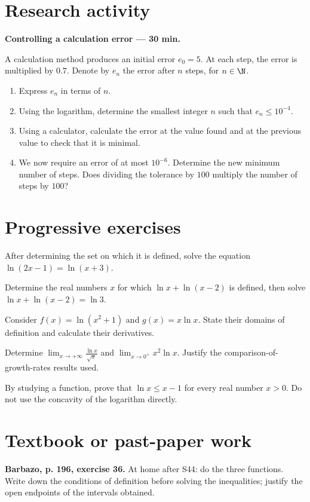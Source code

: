 \section{Research activity}\textbf{Controlling a calculation error --- 30 min.}\par A calculation method produces an initial error $e_0=5$. At each step, the error is multiplied by $0.7$. Denote by $e_n$ the error after $n$ steps, for $n\in\N$.
\begin{enumerate}\item Express $e_n$ in terms of $n$.
\item Using the logarithm, determine the smallest integer $n$ such that $e_n\le10^{-4}$.
\item Using a calculator, calculate the error at the value found and at the previous value to check that it is minimal.
\item We now require an error of at most $10^{-6}$. Determine the new minimum number of steps. Does dividing the tolerance by $100$ multiply the number of steps by $100$?\end{enumerate}

\section{Progressive exercises}

After determining the set on which it is defined, solve the equation $\ln(2x-1)=\ln(x+3)$.

Determine the real numbers $x$ for which $\ln x+\ln(x-2)$ is defined, then solve $\ln x+\ln(x-2)=\ln3$.

Consider $f(x)=\ln(x^2+1)$ and $g(x)=x\ln x$. State their domains of definition and calculate their derivatives.

Determine $\displaystyle\lim_{x\to+\infty}\frac{\ln x}{\sqrt x}$ and $\displaystyle\lim_{x\to0^+}x^2\ln x$. Justify the comparison-of-growth-rates results used.

By studying a function, prove that $\ln x\le x-1$ for every real number $x>0$. Do not use the concavity of the logarithm directly.

\section{Textbook or past-paper work}\textbf{Barbazo, p. 196, exercise 36.} At home after S44: do the three functions. Write down the conditions of definition before solving the inequalities; justify the open endpoints of the intervals obtained.

